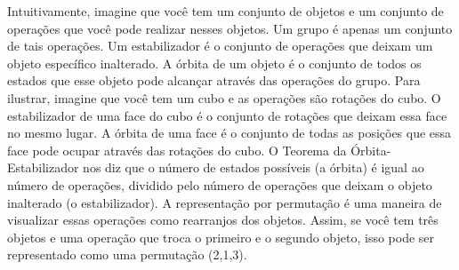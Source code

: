 \documentclass[Algebra/algebra_notes.tex]{subfiles}
\begin{document}
Intuitivamente, imagine que você tem um conjunto de objetos e um conjunto de operações que você pode realizar nesses objetos. Um grupo é apenas um
conjunto de tais operações. Um estabilizador é o conjunto de operações que deixam um objeto específico inalterado. A órbita de um objeto é o conjunto de
todos os estados que esse objeto pode alcançar através das operações do grupo. Para ilustrar, imagine que você tem um cubo e as operações são rotações do cubo.
O estabilizador de uma face do cubo é o conjunto de rotações que deixam essa face no mesmo lugar.
A órbita de uma face é o conjunto de todas as posições que essa face pode ocupar através das rotações do cubo. O Teorema da Órbita-Estabilizador nos diz que
o número de estados possíveis (a órbita) é igual ao número de operações, dividido pelo número de operações que deixam o objeto inalterado (o estabilizador).
A representação por permutação é uma maneira de visualizar essas operações como rearranjos dos objetos. Assim, se você tem três objetos e uma operação que troca
o primeiro e o segundo objeto, isso pode ser representado como uma permutação (2,1,3).
\end{document}
